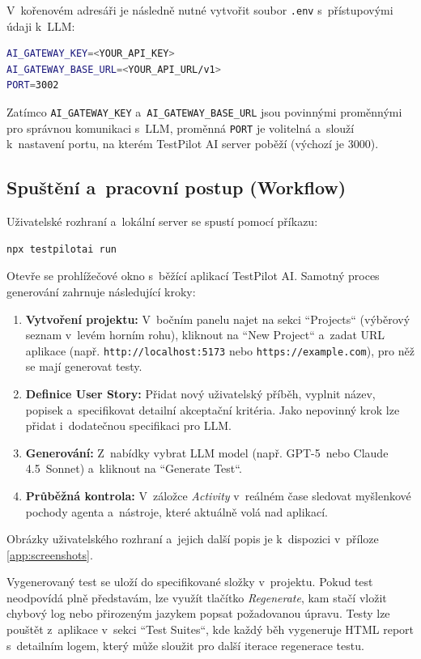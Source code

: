 \documentclass[czech, ing, kiv, he, iso690numb, viewonly]{fasthesis}
\begin{document}
V~kořenovém adresáři je následně nutné vytvořit soubor \texttt{.env} s~přístupovými údaji k~LLM:
\begin{lstlisting}[language=bash, basicstyle=\ttfamily\small]
AI_GATEWAY_KEY=<YOUR_API_KEY>
AI_GATEWAY_BASE_URL=<YOUR_API_URL/v1> 
PORT=3002
\end{lstlisting}
Zatímco \texttt{AI\_GATEWAY\_KEY} a~\texttt{AI\_GATEWAY\_BASE\_URL} jsou povinnými proměnnými pro správnou komunikaci s~LLM, 
proměnná \texttt{PORT} je volitelná a~slouží k~nastavení portu, na kterém TestPilot AI server poběží (výchozí je 3000).

\subsection*{Spuštění a~pracovní postup (Workflow)}
Uživatelské rozhraní a~lokální server se spustí pomocí příkazu:
\begin{lstlisting}[language=bash, basicstyle=\ttfamily\small]
npx testpilotai run
\end{lstlisting}

Otevře se prohlížečové okno s~běžící aplikací TestPilot AI.
Samotný proces generování zahrnuje následující kroky:

\begin{enumerate}
    \item \textbf{Vytvoření projektu:} V~bočním panelu najet na sekci ``Projects`` (výběrový seznam v~levém horním rohu), kliknout 
    na ``New Project`` a~zadat URL aplikace (např. \texttt{http://localhost:5173} nebo \texttt{https://example.com}), 
    pro něž se mají generovat testy.
    \item \textbf{Definice User Story:} Přidat nový uživatelský příběh, vyplnit název, popisek
    a~specifikovat detailní akceptační kritéria. Jako nepovinný krok lze přidat i~dodatečnou specifikaci pro LLM.
    \item \textbf{Generování:} Z~nabídky vybrat LLM model (např. GPT-5~nebo Claude 4.5~Sonnet) 
    a~kliknout na ``Generate Test``.
    \item \textbf{Průběžná kontrola:} V~záložce \textit{Activity} v~reálném čase 
    sledovat myšlenkové pochody agenta a~nástroje, které aktuálně volá nad aplikací.
\end{enumerate}
Obrázky uživatelského rozhraní a~jejich další popis je k~dispozici v~příloze \ref{app:screenshots}.
\newline

Vygenerovaný test se uloží do specifikované složky v~projektu. 
Pokud test neodpovídá plně představám, lze využít tlačítko \textit{Regenerate}, kam 
stačí vložit chybový log nebo přirozeným jazykem popsat požadovanou úpravu.
Testy lze pouštět z~aplikace v~sekci ``Test Suites``, kde každý běh vygeneruje HTML report s~detailním logem,
který může sloužit pro další iterace regenerace testu.
\end{document}
